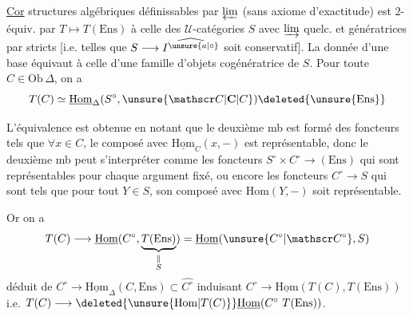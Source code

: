 \uline{Cor}   structures algébriques définissables par $\varprojlim$ (sans axiome d'exactitude)  est 2-équiv. par $T\longmapsto T(\mathrm{Ens})$ à celle des $\mathcal U$-catégories $S$ avec $\varinjlim$ quelc. et    génératrices par  stricts [i.e. telles que $S\longrightarrow\widehat{I^{\unsure{a|\circ}}}$ soit conservatif]. La donnée d'une base  équivaut à celle d'une famille d'objets cogénératrice de $S$. Pour toute $C\in\mathrm{Ob}\,\Delta$, on a
\[
T(C)\simeq\underline{\mathrm{Hom}}_{\Delta}(S^\circ,\unsure{\mathscr C|\mathbf C|C})\deleted{\unsure{\mathrm{Ens}}}
\]

L'équivalence est obtenue en notant que le deuxième mb est formé des foncteurs tels que $\forall x\in C$, le composé avec $\underline{\mathrm{Hom}}_{C}(x,-)$ est représentable, donc le deuxième mb  peut s'interpréter comme les foncteurs $S^\circ\times C^\circ\longrightarrow(\mathrm{Ens})$ qui sont représentables pour chaque argument fixé, ou encore les foncteurs $C^\circ\longrightarrow S$ qui sont tels que pour tout $Y\in S$, son composé avec $\mathrm{Hom}(Y,-)$ soit représentable.

Or on a
\[
T(C)\longrightarrow\underline{\mathrm{Hom}}(C^\circ,\underbrace{T(\mathrm{Ens})}_{\substack{\Vert\\S}})=\underline{\mathrm{Hom}}(\unsure{C^\circ|\mathscr C^\circ},S)
\]
déduit de $C^\circ\longrightarrow\underline{\mathrm{Hom}}_{\Delta}(C,\mathrm{Ens})\subset\widehat{C^\circ}$ induisant $C^\circ\longrightarrow\underline{\mathrm{Hom}}(T(C),T(\mathrm{Ens}))$ i.e. $T(C)\longrightarrow\deleted{\unsure{\mathrm{Hom}|T(C)}}\underline{\mathrm{Hom}}(C^\circ\ T(\mathrm{Ens}))$.


